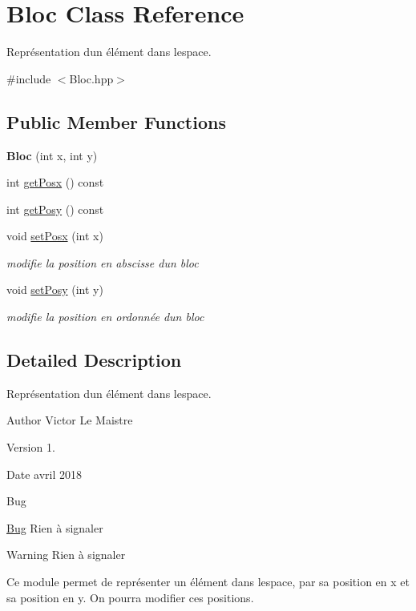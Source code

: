 \hypertarget{classBloc}{}\section{Bloc Class Reference}
\label{classBloc}


Représentation d\textquotesingle{}un élément dans l\textquotesingle{}espace.  




{\ttfamily \#include $<$Bloc.\+hpp$>$}

\subsection*{Public Member Functions}
\begin{DoxyCompactItemize}
\item 
\mbox{\label{classBloc_a67d18e588715a983cf7980ae23d9e939}} 
{\bfseries Bloc} (int x, int y)
\item 
int \hyperlink{classBloc_a1600764b66f921e77cb5ca8d2946a3e2}{get\+Posx} () const
\item 
int \hyperlink{classBloc_a362522a2a75cefdbba44a544cd7f1a75}{get\+Posy} () const
\item 
void \hyperlink{classBloc_a2d50fb680c5b8d3d3de2566a125d25a2}{set\+Posx} (int x)
\begin{DoxyCompactList}\small\item\em modifie la position en abscisse d\textquotesingle{}un bloc \end{DoxyCompactList}\item 
void \hyperlink{classBloc_a361647f817b1f6202ee29c77e8f03f79}{set\+Posy} (int y)
\begin{DoxyCompactList}\small\item\em modifie la position en ordonnée d\textquotesingle{}un bloc \end{DoxyCompactList}\end{DoxyCompactItemize}


\subsection{Detailed Description}
Représentation d\textquotesingle{}un élément dans l\textquotesingle{}espace. 

\begin{DoxyAuthor}{Author}
Victor Le Maistre 
\end{DoxyAuthor}
\begin{DoxyVersion}{Version}
1. 
\end{DoxyVersion}
\begin{DoxyDate}{Date}
avril 2018 
\end{DoxyDate}
\begin{DoxyRefDesc}{Bug}
\item[\hyperlink{bug__bug000001}{Bug}]Rien à signaler \end{DoxyRefDesc}
\begin{DoxyWarning}{Warning}
Rien à signaler
\end{DoxyWarning}
Ce module permet de représenter un élément dans l\textquotesingle{}espace, par sa position en x et sa position en y. On pourra modifier ces positions. 

